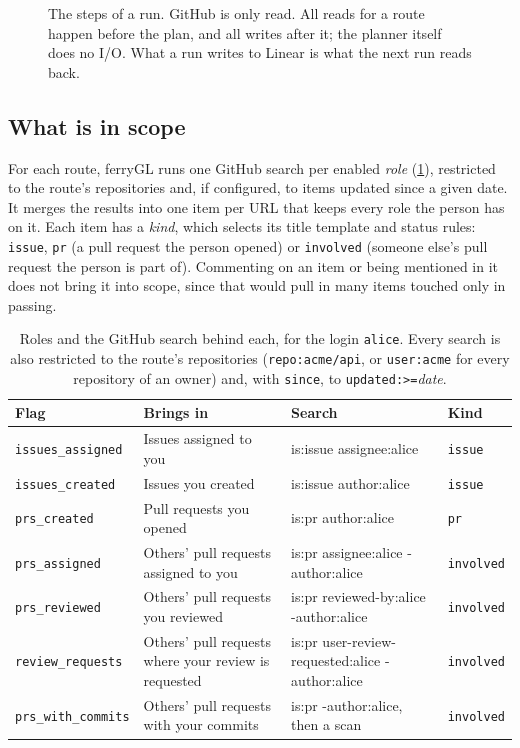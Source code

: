 \documentclass[11pt,a4paper]{article}
\newcommand{\ferry}{ferryGL}
\newcommand{\code}[1]{\texttt{#1}}
\newcommand{\key}[1]{\texttt{#1}}
\begin{document}
\begin{figure}[t]
  \centering
  
  \caption{The steps of a run. GitHub is only read. All reads for a route happen before the
    plan, and all writes after it; the planner itself does no I/O. What a run writes to Linear
    is what the next run reads back.}
  \label{fig:run}
\end{figure}

\subsection{What is in scope}
\label{sec:scope}

For each route, \ferry{} runs one GitHub search per enabled \emph{role} (\cref{tab:roles}),
restricted to the route's repositories and, if configured, to items updated since a given date.
It merges the results into one item per URL that keeps every role the person has on it. Each
item has a \emph{kind}, which selects its title template and status rules: \key{issue},
\key{pr} (a pull request the person opened) or \key{involved} (someone else's pull request the
person is part of). Commenting on an item or being mentioned in it does not bring it into
scope, since that would pull in many items touched only in passing.

\begin{table}[t]
  \centering\small
  \caption{Roles and the GitHub search behind each, for the login \code{alice}. Every search
    is also restricted to the route's repositories (\code{repo:acme/api}, or \code{user:acme}
    for every repository of an owner) and, with \code{since}, to \code{updated:>=}\emph{date}.}
  \label{tab:roles}
  \begin{tabularx}{\linewidth}{@{}l >{\raggedright\arraybackslash}X >{\ttfamily\footnotesize}l l@{}}
    \toprule
    Flag & Brings in & \normalfont\small Search & Kind \\
    \midrule
    \code{issues\_assigned} & Issues assigned to you & is:issue assignee:alice & \key{issue} \\
    \code{issues\_created} & Issues you created & is:issue author:alice & \key{issue} \\
    \code{prs\_created} & Pull requests you opened & is:pr author:alice & \key{pr} \\
    \code{prs\_assigned} & Others' pull requests assigned to you & is:pr assignee:alice -author:alice & \key{involved} \\
    \code{prs\_reviewed} & Others' pull requests you reviewed & is:pr reviewed-by:alice -author:alice & \key{involved} \\
    \code{review\_requests} & Others' pull requests where your review is requested & is:pr user-review-requested:alice -author:alice & \key{involved} \\
    \code{prs\_with\_commits} & Others' pull requests with your commits & is:pr -author:alice\normalfont\small, then a scan & \key{involved} \\
    \bottomrule
  \end{tabularx}
\end{table}
\end{document}
